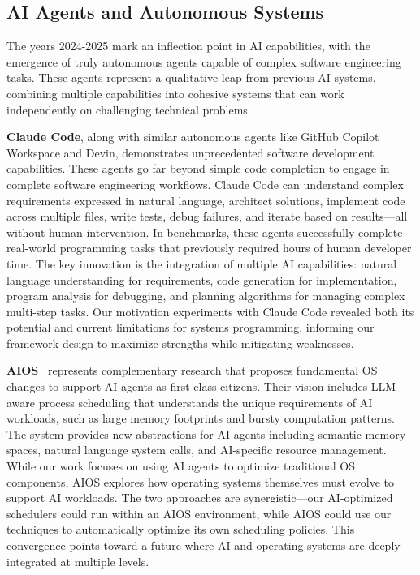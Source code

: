 \subsection{AI Agents and Autonomous Systems}

The years 2024-2025 mark an inflection point in AI capabilities, with the emergence of truly autonomous agents capable of complex software engineering tasks. These agents represent a qualitative leap from previous AI systems, combining multiple capabilities into cohesive systems that can work independently on challenging technical problems.

\textbf{Claude Code}, along with similar autonomous agents like GitHub Copilot Workspace and Devin, demonstrates unprecedented software development capabilities. These agents go far beyond simple code completion to engage in complete software engineering workflows. Claude Code can understand complex requirements expressed in natural language, architect solutions, implement code across multiple files, write tests, debug failures, and iterate based on results—all without human intervention. In benchmarks, these agents successfully complete real-world programming tasks that previously required hours of human developer time. The key innovation is the integration of multiple AI capabilities: natural language understanding for requirements, code generation for implementation, program analysis for debugging, and planning algorithms for managing complex multi-step tasks. Our motivation experiments with Claude Code revealed both its potential and current limitations for systems programming, informing our framework design to maximize strengths while mitigating weaknesses.

\textbf{AIOS}~\cite{mei2024aios} represents complementary research that proposes fundamental OS changes to support AI agents as first-class citizens. Their vision includes LLM-aware process scheduling that understands the unique requirements of AI workloads, such as large memory footprints and bursty computation patterns. The system provides new abstractions for AI agents including semantic memory spaces, natural language system calls, and AI-specific resource management. While our work focuses on using AI agents to optimize traditional OS components, AIOS explores how operating systems themselves must evolve to support AI workloads. The two approaches are synergistic—our AI-optimized schedulers could run within an AIOS environment, while AIOS could use our techniques to automatically optimize its own scheduling policies. This convergence points toward a future where AI and operating systems are deeply integrated at multiple levels.

